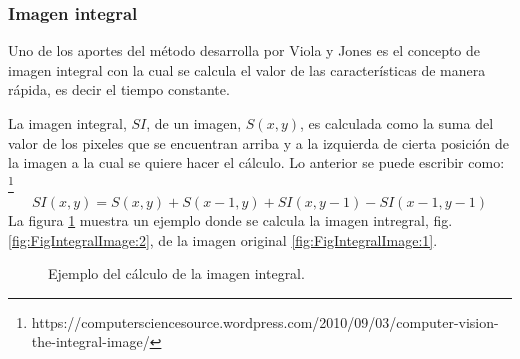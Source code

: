 \subsubsection{Imagen integral}\label{sssec:IntegralImage} 

Uno de los aportes del método desarrolla por Viola y Jones es el concepto de imagen integral con la cual se calcula el valor de las características de manera rápida, es decir el tiempo constante. 

La imagen integral, $SI$, de un imagen, $S(x,y)$, es calculada como la suma del valor de los pixeles que se encuentran arriba y a la izquierda de cierta posición de la imagen a la cual se quiere hacer el cálculo. Lo anterior se puede escribir como: \footnote{https://computersciencesource.wordpress.com/2010/09/03/computer-vision-the-integral-image/}     
$$SI(x,y)=S(x,y) + S(x-1,y) + SI(x,y-1)-SI(x-1,y-1)$$ 
La figura \ref{fig:FigIntegralImage} muestra un  ejemplo donde se calcula la imagen intregral, fig. \ref{fig:FigIntegralImage:2}, de la imagen original \ref{fig:FigIntegralImage:1}.
\begin{figure}[h!]
\centering
{} \qquad
{}
\caption{Ejemplo del cálculo de la imagen integral.} \label{fig:FigIntegralImage}
\end{figure}

